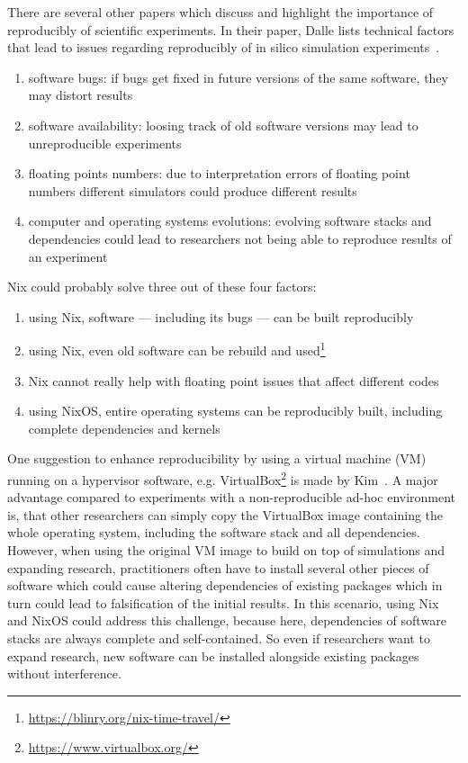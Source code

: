 \documentclass{eceasst}
\begin{document}
There are several other papers which discuss and highlight the importance of reproducibly of scientific experiments.
In their paper, Dalle lists technical factors that lead to issues regarding reproducibly of in silico simulation experiments~\cite{Dalle_2012}.
\begin{enumerate}
    \item software bugs: if bugs get fixed in future versions of the same software, they may distort results
    \item software availability: loosing track of old software versions may lead to unreproducible experiments
    \item floating points numbers: due to interpretation errors of floating point numbers different simulators could produce different results
    \item computer and operating systems evolutions: evolving software stacks and dependencies could lead to researchers not being able to reproduce results of an experiment
\end{enumerate}
Nix could probably solve three out of these four factors:
\begin{enumerate}
    \item using Nix, software --- including its bugs --- can be built reproducibly
    \item using Nix, even old software can be rebuild and used\footnote{\url{https://blinry.org/nix-time-travel/}}
    \item Nix cannot really help with floating point issues that affect different codes
    \item using NixOS, entire operating systems can be reproducibly built, including complete dependencies and kernels
\end{enumerate}

One suggestion to enhance reproducibility by using a virtual machine (VM) running on a hypervisor software, e.g. VirtualBox\footnote{\url{https://www.virtualbox.org/}} is made by Kim~\cite{Kim_2019}.
A major advantage compared to experiments with a non-reproducible ad-hoc environment is, that other researchers can simply copy the VirtualBox image containing the whole operating system, including the software stack and all dependencies.
However, when using the original VM image to build on top of simulations and expanding research, practitioners often have to install several other pieces of software which could cause altering dependencies of existing packages which in turn could lead to falsification of the initial results.
In this scenario, using Nix and NixOS could address this challenge, because here, dependencies of software stacks are always complete and self-contained.
So even if researchers want to expand research, new software can be installed alongside existing packages without interference.
\end{document}
